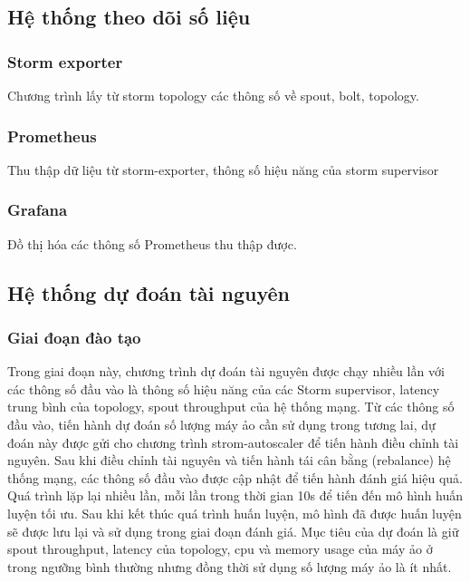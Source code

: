 \subsection{Hệ thống theo dõi số liệu}

\subsubsection{Storm exporter}

Chương trình lấy từ storm topology các thông số về spout, bolt, topology.

\subsubsection{Prometheus}

Thu thập dữ liệu từ storm-exporter, thông số hiệu năng của storm supervisor

\subsubsection{Grafana}

Đồ thị hóa các thông số Prometheus thu thập được.

\subsection{Hệ thống dự đoán tài nguyên}

\subsubsection{Giai đoạn đào tạo}
Trong giai đoạn này, chương trình dự đoán tài nguyên được chạy nhiều lần với các thông số đầu vào là thông số hiệu năng của các Storm supervisor, latency trung bình của topology, spout throughput của hệ thống mạng. Từ các thông số đầu vào, tiến hành dự đoán số lượng máy ảo cần sử dụng trong tương lai, dự đoán này được gửi cho chương trình strom-autoscaler để tiến hành điều chỉnh tài nguyên. Sau khi điều chỉnh tài nguyên và tiến hành tái cân bằng (rebalance) hệ thống mạng, các thông số đầu vào được cập nhật để tiến hành đánh giá hiệu quả. Quá trình lặp lại nhiều lần, mỗi lần trong thời gian 10s để tiến đến mô hình huấn luyện tối ưu. Sau khi kết thúc quá trình huấn luyện, mô hình đã được huấn luyện sẽ được lưu lại và sử dụng trong giai đoạn đánh giá. Mục tiêu của dự đoán là giữ spout throughput, latency của topology, cpu và memory usage của máy ảo ở trong ngưỡng bình thường nhưng đồng thời sử dụng số lượng máy ảo là ít nhất.

